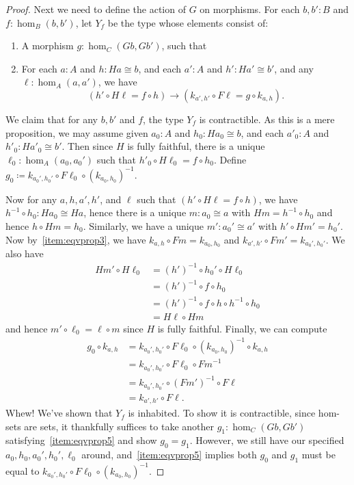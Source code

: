 \documentclass{amsart}
\newcommand{\defeq}{\coloneqq}  %
\theoremstyle{definition}
\theoremstyle{remark}
\numberwithin{equation}{section}
\newcommand{\inv}[1]{{#1}^{-1}}
\begin{document}
\begin{proof}
  Next we need to define the action of $G$ on morphisms.
  For each $b,b':B$ and $f:\hom_B(b,b')$, let $Y_f$ be the type whose elements consist of:
  \begin{enumerate}[resume]
  \item A morphism $g:\hom_C(Gb,Gb')$, such that
  \item For each $a:A$ and $h:Ha\cong b$, and each $a':A$ and $h':Ha'\cong b'$, and any $\ell:\hom_A(a,a')$, we have\label{item:eqvprop5}
    \[ (h' \circ H\ell = f \circ h)
    \to
    (k_{a',h'} \circ F\ell = g\circ k_{a,h}). \]
  \end{enumerate}
  We claim that for any $b,b'$ and $f$, the type $Y_f$ is contractible.
  As this is a mere proposition, we may assume given $a_0:A$ and $h_0:Ha_0\cong b$, and each $a'_0:A$ and $h'_0:Ha'_0\cong b'$.
  Then since $H$ is fully faithful, there is a unique $\ell_0:\hom_A(a_0,a_0')$ such that $h'_0 \circ H\ell_0 = f \circ h_0$.
  Define $g_0 \defeq k_{a_0',h_0'} \circ F \ell_0 \circ \inv{(k_{a_0,h_0})}$.

  Now for any $a,h,a',h'$, and $\ell$ such that $(h' \circ H\ell = f \circ h)$, we have $\inv{h}\circ h_0:Ha_0\cong Ha$, hence there is a unique $m:a_0\cong a$ with $Hm = \inv{h}\circ h_0$ and hence $h\circ Hm = h_0$.
  Similarly, we have a unique $m':a_0'\cong a'$ with $h'\circ Hm' = h_0'$.
  Now by~\ref{item:eqvprop3}, we have $k_{a,h}\circ Fm = k_{a_0,h_0}$ and $k_{a',h'}\circ Fm' = k_{a_0',h_0'}$.
  We also have
  \begin{align*}
    Hm' \circ H\ell_0 
    &= \inv{(h')} \circ h_0' \circ H\ell_0\\
    &= \inv{(h')} \circ f \circ h_0\\
    &= \inv{(h')} \circ f \circ h \circ \inv{h} \circ h_0\\
    &= H\ell \circ Hm
  \end{align*}
  and hence $m'\circ \ell_0 = \ell\circ m$ since $H$ is fully faithful.
  Finally, we can compute
  \begin{align*}
    g_0 \circ k_{a,h}
    &= k_{a_0',h_0'} \circ F \ell_0 \circ \inv{(k_{a_0,h_0})} \circ k_{a,h}\\
    &= k_{a_0',h_0'} \circ F \ell_0 \circ \inv{Fm}\\
    &= k_{a_0',h_0'} \circ \inv{(Fm')} \circ F\ell\\
    &= k_{a',h'}\circ F\ell.
  \end{align*}
  Whew!  We've shown that $Y_f$ is inhabited.
  To show it is contractible, since hom-sets are sets, it thankfully suffices to take another $g_1:\hom_C(Gb,Gb')$ satisfying~\ref{item:eqvprop5} and show $g_0=g_1$.
  However, we still have our specified $a_0,h_0,a_0',h_0',\ell_0$ around, and~\ref{item:eqvprop5} implies both $g_0$ and $g_1$ must be equal to $k_{a_0',h_0'} \circ F \ell_0 \circ \inv{(k_{a_0,h_0})}$.


\end{proof}
\end{document}
